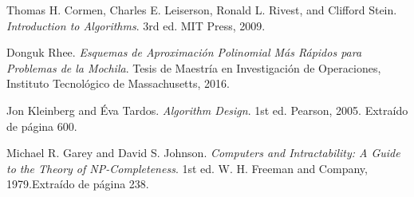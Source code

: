 \documentclass{report}
\begin{document}
		
	
	
	\begin{thebibliography}{9}
		
		Thomas H. Cormen, Charles E. Leiserson, Ronald L. Rivest, and Clifford Stein.
		\textit{Introduction to Algorithms}.
		3rd ed. MIT Press, 2009.
		
		Donguk Rhee.
		\textit{Esquemas de Aproximación Polinomial Más Rápidos para Problemas de la Mochila}.
		Tesis de Maestría en Investigación de Operaciones, Instituto Tecnológico de Massachusetts, 2016.
		
		Jon Kleinberg and Éva Tardos.
		\textit{Algorithm Design}.
		1st ed. Pearson, 2005. Extraído de página 600.

		Michael R. Garey and David S. Johnson.
		\textit{Computers and Intractability: A Guide to the Theory of NP-Completeness}.
		1st ed. W. H. Freeman and Company, 1979.Extraído de página 238.
		
		
	\end{thebibliography}
\end{document}
